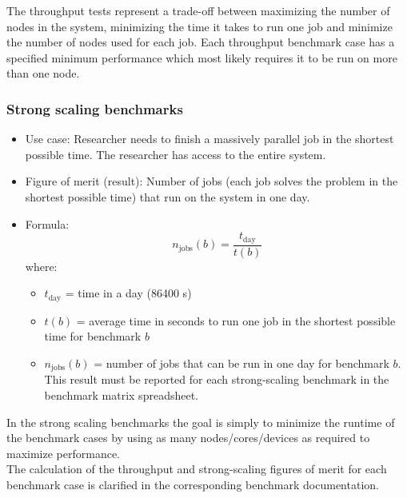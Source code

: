 \documentclass{article}
\begin{document}
The throughput tests represent a trade-off between maximizing the number of nodes in the system, minimizing the time it takes to run one job and minimize the number of nodes used for each job. Each
throughput benchmark case has a specified minimum performance which most likely requires it to be run on more than one node.

\subsubsection*{Strong scaling benchmarks}

\begin{itemize}
    \item Use case: Researcher needs to finish a massively parallel job in the shortest possible time. The researcher has access to the entire system.
    \item Figure of merit (result): Number of jobs (each job solves the problem in the shortest possible time) that run on the system in one day.
    \item Formula:
    \begin{equation}
        n_{\textrm{jobs}}(b) = \frac{t_{\textrm{day}}}{t(b)} 
    \end{equation}
    where:
    \begin{itemize}
        \item $t_{\textrm{day}}$ = time in a day (86400 s)
        \item $t(b)$ = average time in seconds to run one job in the shortest possible time for benchmark $b$
        \item $n_{\textrm{jobs}}(b)$ = number of jobs that can be run in one day for benchmark $b$. This result must be reported for each strong-scaling benchmark in the benchmark matrix spreadsheet.
    \end{itemize}
\end{itemize}

In the strong scaling benchmarks the goal is simply to minimize the runtime of the benchmark cases by using as many nodes/cores/devices as required to maximize performance.\\

The calculation of the throughput and strong-scaling figures of merit
for each benchmark case is clarified in the corresponding benchmark 
documentation.
\end{document}
